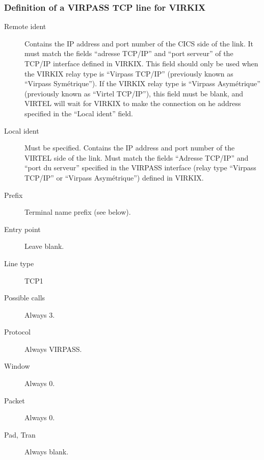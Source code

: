 \documentclass[letterpaper,10pt,english]{sphinxmanual}
\begin{document}
\subsubsection{Definition of a VIRPASS TCP line for VIRKIX}
\label{\detokenize{connectivity_guide:definition-of-a-virpass-tcp-line-for-virkix}}\begin{description}
\item[{Remote ident}] \leavevmode
Contains the IP address and port number of the CICS side of the link. It must match the fields “adresse TCP/IP” and “port serveur” of the TCP/IP interface defined in VIRKIX. This field should only be used when the VIRKIX relay type is “Virpass TCP/IP” (previously known as “Virpass Symétrique”). If the VIRKIX relay type is “Virpass Asymétrique” (previously known as “Virtel TCP/IP”), this field must be blank, and VIRTEL will wait for VIRKIX to make the connection on he address specified in the “Local ident” field.

\item[{Local ident}] \leavevmode
Must be specified. Contains the IP address and port number of the VIRTEL side of the link. Must match the fields “Adresse TCP/IP” and “port du serveur” specified in the VIRPASS interface (relay type “Virpass TCP/IP” or “Virpass Asymétrique”) defined in VIRKIX.

\item[{Prefix}] \leavevmode
Terminal name prefix (see below).

\item[{Entry point}] \leavevmode
Leave blank.

\item[{Line type}] \leavevmode
TCP1

\item[{Possible calls}] \leavevmode
Always 3.

\item[{Protocol}] \leavevmode
Always VIRPASS.

\item[{Window}] \leavevmode
Always 0.

\item[{Packet}] \leavevmode
Always 0.

\item[{Pad, Tran}] \leavevmode
Always blank.

\end{description}
\end{document}
